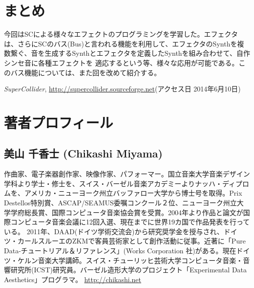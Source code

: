 \documentclass{jsarticle}
\begin{document}
\section{まとめ}
今回はSCによる様々なエフェクトのプログラミングを学習した。エフェクタは、さらにSCのバス(Bus)と言われる機能を利用して、エフェクタのSynthを複数繋ぐ、音を生成するSynthとエフェクタを定義したSynthを組み合わせて、自作シンセ音に各種エフェクトを
適応するという等、様々な応用が可能である。このバス機能については、また回を改めて紹介する。


\begin{thebibliography}{citations}
   {\it SuperCollider}, \url{http://supercollider.sourceforge.net}(アクセス日 2014年6月10日)
\end{thebibliography}

\section{著者プロフィール}
\subsection*{美山 千香士 (Chikashi Miyama)}
作曲家、電子楽器創作家、映像作家、パフォーマー。国立音楽大学音楽デザイン学科より学士・修士を、スイス・バーゼル音楽アカデミーよりナッハ・ディプロムを、アメリカ・ニューヨーク州立バッファロー大学から博士号を取得。Prix Destellos特別賞、ASCAP/SEAMUS委嘱コンクール２位、ニューヨーク州立大学学府総長賞、国際コンピュータ音楽協会賞を受賞。2004年より作品と論文が国際コンピュータ音楽会議に12回入選、現在までに世界19カ国で作品発表を行っている。 2011年、DAAD(ドイツ学術交流会)から研究奨学金を授与され、ドイツ・カールスルーエのZKMで客員芸術家として創作活動に従事。近著に「Pure Data-チュートリアル＆リファレンス」(Works Corporation 社)がある。現在ドイツ・ケルン音楽大学講師。スイス・チューリッヒ芸術大学コンピュータ音楽・音響研究所(ICST)研究員。バーゼル造形大学のプロジェクト「Experimental Data Aesthetics」プログラマ。
\url{http://chikashi.net}
\end{document}
